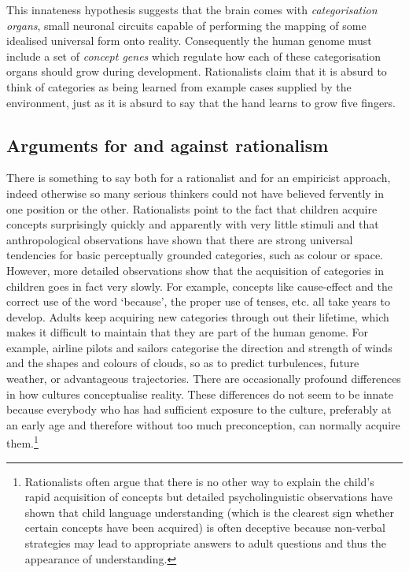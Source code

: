 This innateness hypothesis suggests that the brain comes
with {\it categorisation organs}, small neuronal circuits
capable of performing 
the mapping of some idealised universal form onto
reality. Consequently the human genome
must include a set of {\it concept genes} which regulate how each of 
these categorisation organs should grow during 
development. Rationalists claim
that it is absurd to think of categories as being 
learned from example cases supplied by the environment, just 
as it is absurd to say that the hand learns to 
grow five fingers.

\subsection{Arguments for and against rationalism}

There is something to say both for a rationalist and 
for an empiricist approach, indeed otherwise so many
serious thinkers could not have believed fervently 
in one position or the other. Rationalists point to the 
fact that children acquire concepts
surprisingly quickly and apparently with very little stimuli
and that anthropological observations have 
shown that there are strong universal tendencies
for basic perceptually grounded categories, such as colour or 
space. However, more detailed observations show
that the acquisition of categories in children goes 
in fact very slowly. For example, concepts like cause-effect
and the correct use of the word `because', the proper
use of tenses, etc. all take years to develop. 
Adults keep acquiring
new categories through out their lifetime, which makes 
it difficult to maintain that they are part of the 
human genome. For example, 
airline pilots and sailors categorise the direction and 
strength of winds and the shapes and colours of clouds, 
so as to predict turbulences, future weather, or 
advantageous trajectories. There are
occasionally profound differences in how cultures conceptualise
reality. These differences do not seem to be innate because
everybody who has had sufficient exposure to the 
culture, preferably at an early age and therefore without too much 
preconception, can normally acquire them.\footnote{
Rationalists often argue that there is no other way 
to explain the child's rapid acquisition of concepts
but detailed psycholinguistic observations have shown that 
child language understanding (which is the 
clearest sign whether certain concepts have been acquired)
is often deceptive because 
non-verbal strategies may lead to appropriate answers
to adult questions and thus the appearance of 
understanding.}

